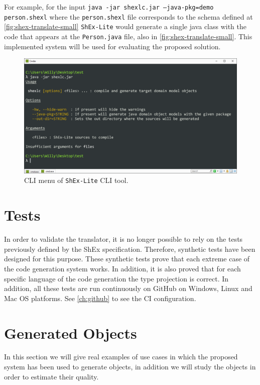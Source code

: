 For example, for the input \texttt{java -jar shexlc.jar --java-pkg=demo person.shexl} where the \texttt{person.shexl}
file corresponds to the schema defined at \cref{fig:shex-translate-small} \texttt{ShEx-Lite} would generate a single java
class with the code that appears at the \texttt{Person.java} file, also in \cref{fig:shex-translate-small}.
This implemented system will be used for evaluating the proposed solution.

\begin{figure}
    \includegraphics[width=\textwidth]{images/shexlc-menu.PNG}
    \centering
	\caption[CLI menu of \texttt{ShEx-Lite} CLI tool]{CLI menu of \texttt{ShEx-Lite} CLI tool.}
    \label{fig:menu-tool}
\end{figure}

\section{Tests}
In order to validate the translator, it is no longer possible to rely on the tests previously
defined by the ShEx specification. Therefore, synthetic tests have been designed for this purpose.
These synthetic tests prove that each extreme case of the code generation system works. In addition,
it is also proved that for each specific language of the code generation the type projection is correct.
In addition, all these tests are run continuously on GitHub on Windows, Linux and Mac OS platforms.
See \cref{ch:github} to see the CI configuration.

\section{Generated Objects}
In this section we will give real examples of use cases in which the proposed system has been used to generate objects,
in addition we will study the objects in order to estimate their quality.

